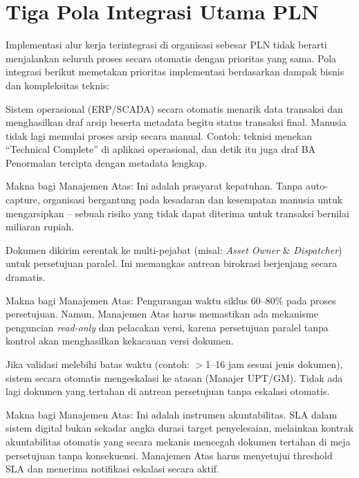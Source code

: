 \documentclass[12pt,a4paper]{report}
\begin{document}

\section{Tiga Pola Integrasi Utama PLN}
Implementasi alur kerja terintegrasi di organisasi sebesar PLN tidak berarti menjalankan seluruh proses secara otomatis dengan prioritas yang sama. Pola integrasi berikut memetakan prioritas implementasi berdasarkan dampak bisnis dan kompleksitas teknis:

\begin{plnbox}
Sistem operasional (ERP/SCADA) secara otomatis menarik data transaksi dan menghasilkan draf arsip beserta metadata begitu status transaksi final. Manusia tidak lagi memulai proses arsip secara manual. Contoh: teknisi menekan ``Technical Complete'' di aplikasi operasional, dan detik itu juga draf BA Penormalan tercipta dengan metadata lengkap.

Makna bagi Manajemen Atas: Ini adalah prasyarat kepatuhan. Tanpa auto-capture, organisasi bergantung pada kesadaran dan kesempatan manusia untuk mengarsipkan -- sebuah risiko yang tidak dapat diterima untuk transaksi bernilai miliaran rupiah.
\end{plnbox}

\begin{plnbox}
Dokumen dikirim serentak ke multi-pejabat (misal: \textit{Asset Owner} \& \textit{Dispatcher}) untuk persetujuan paralel. Ini memangkas antrean birokrasi berjenjang secara dramatis.

Makna bagi Manajemen Atas: Pengurangan waktu siklus 60--80\% pada proses persetujuan. Namun, Manajemen Atas harus memastikan ada mekanisme penguncian \textit{read-only} dan pelacakan versi, karena persetujuan paralel tanpa kontrol akan menghasilkan kekacauan versi dokumen.
\end{plnbox}

\begin{plnbox}
Jika validasi melebihi batas waktu (contoh: $>$1--16 jam sesuai jenis dokumen), sistem secara otomatis mengeskalasi ke atasan (Manajer UPT/GM). Tidak ada lagi dokumen yang tertahan di antrean persetujuan tanpa eskalasi otomatis.

Makna bagi Manajemen Atas: Ini adalah instrumen akuntabilitas. SLA dalam sistem digital bukan sekadar angka durasi target penyelesaian, melainkan kontrak akuntabilitas otomatis yang secara mekanis mencegah dokumen tertahan di meja persetujuan tanpa konsekuensi. Manajemen Atas harus menyetujui threshold SLA dan menerima notifikasi eskalasi secara aktif.
\end{plnbox}
\end{document}
